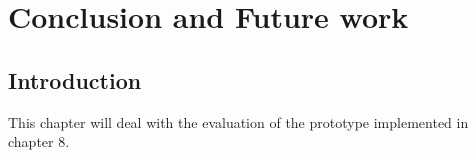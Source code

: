 \chapter{Conclusion and Future work}
\section{Introduction}
This chapter will deal with the evaluation of the prototype implemented in chapter 8.

